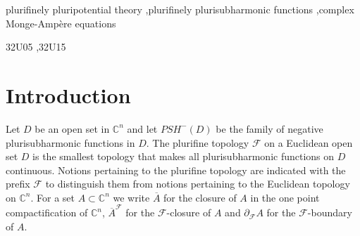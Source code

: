 \documentclass[3p,times]{elsarticle}
\numberwithin{equation}{section}
\newtheorem{The main theorem}[theorem]{The main theorem}
\theoremstyle{definition}
\begin{document}
\begin{frontmatter}
\begin{keyword}
 plurifinely pluripotential theory    \sep plurifinely plurisubharmonic functions
 \sep complex Monge-Amp\`ere equations 


 \MSC[2010] 32U05 \sep 32U15
\end{keyword}

\end{frontmatter}






\section{Introduction}


Let $D$ be an open set in $\mathbb C^n$ and let   $ PSH^-(D)$ be the family of negative plurisubharmonic functions in $D$. 
The plurifine topology $\mathcal F$ on a  Euclidean open set $D$  is the smallest topology that makes all plurisubharmonic functions on $D$ continuous. 
Notions pertaining to the plurifine topology are indicated with the prefix $\mathcal F$ to distinguish them from notions pertaining to the Euclidean topology on $\mathbb C^n$.
For a set $A\subset \mathbb  C^n$ we write $\overline{A}$ for the closure of $A$ in the one point compactification
of $\mathbb C^n$, $\overline{A}^{\mathcal F}$ for the $\mathcal F$-closure of $A$ and $\partial _{\mathcal F}A$ for the $\mathcal F$-boundary of $A$. 
\end{document}
